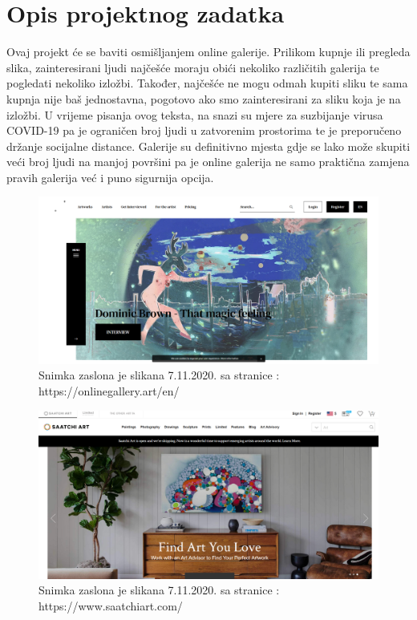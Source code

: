 \chapter{Opis projektnog zadatka}
		
		{Ovaj projekt će se baviti osmišljanjem online galerije. Prilikom kupnje ili pregleda slika, zainteresirani ljudi najčešće moraju obići nekoliko različitih galerija te pogledati nekoliko  izložbi. Također, najčešće ne mogu odmah kupiti sliku te sama kupnja nije baš jednostavna, pogotovo ako smo zainteresirani za sliku koja je na izložbi. 
		U vrijeme pisanja ovog  teksta, na snazi su mjere za suzbijanje virusa COVID-19 pa je ograničen broj ljudi u zatvorenim prostorima te je preporučeno držanje socijalne distance. Galerije su definitivno mjesta gdje se lako može skupiti veći broj ljudi na manjoj površini pa je online galerija ne samo praktična zamjena pravih galerija već i puno sigurnija opcija. 	
		\vspace{10mm} 
}
		\graphicspath{ {./slike/} }
				\begin{figure}[H]

					\includegraphics[width=\textwidth,height=\textheight,keepaspectratio]{onlinegallery_art}
					\caption{\newline Snimka zaslona je slikana 7.11.2020. sa  stranice : https://onlinegallery.art/en/ }

				\end{figure}
		\graphicspath{ {./slike/} }
				\begin{figure}[H]

					\includegraphics[width=\textwidth,height=\textheight,keepaspectratio]{saatchiart_com}
					\caption{\newline Snimka zaslona je slikana 7.11.2020. sa  stranice : https://www.saatchiart.com/}

				\end{figure}	
		
